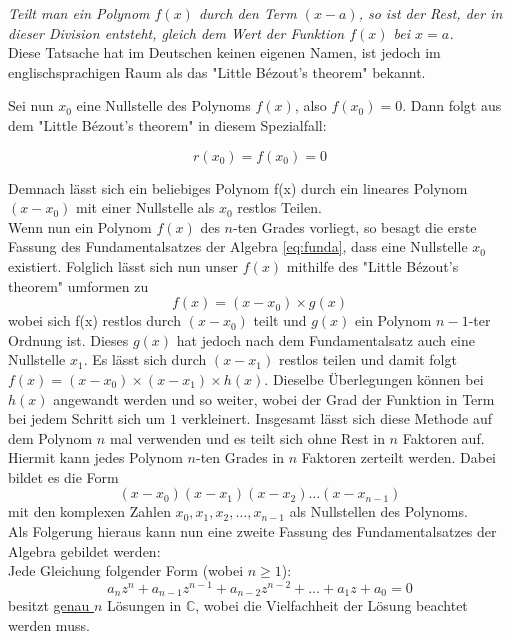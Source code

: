 \documentclass[a4paper,12pt]{article} %
\begin{document}
\noindent \emph{Teilt man ein Polynom $f(x)$ durch den Term $(x-a)$, so ist der Rest, der in dieser Division entsteht, gleich dem Wert der Funktion $f(x)$ bei $x=a$.}\\

Diese Tatsache hat im Deutschen keinen eigenen Namen, ist jedoch im englischsprachigen Raum als das "Little Bézout's theorem" bekannt.

Sei nun $x_0$ eine Nullstelle des Polynoms $f(x)$, also $f(x_0)=0$. Dann folgt aus dem "Little Bézout's theorem" {}in diesem Spezialfall:


\begin{equation}\label{eq:bezout0}
r(x_0) = f(x_0)=0
\end{equation}

Demnach lässt sich ein beliebiges Polynom f(x) durch ein lineares Polynom $(x-x_0)$ mit einer Nullstelle als $x_0$ restlos Teilen.\\

Wenn nun ein Polynom $f(x)$ des $n$-ten Grades vorliegt, so besagt die erste Fassung des Fundamentalsatzes der Algebra \eqref{eq:funda}, dass eine Nullstelle $x_0$ existiert. Folglich lässt sich nun unser $f(x)$ mithilfe des "Little Bézout's theorem" {}umformen zu
\[f(x)=(x-x_0) \times g(x)\]
wobei sich f(x) restlos durch $(x-x_0)$ teilt und $g(x)$ ein Polynom $n-1$-ter Ordnung ist.
Dieses $g(x)$ hat jedoch nach dem Fundamentalsatz auch eine Nullstelle $x_1$.
Es lässt sich durch $(x-x_1)$ restlos teilen und damit folgt $f(x) = (x-x_0) \times (x-x_1) \times h(x)$.
Dieselbe Überlegungen können bei $h(x)$ angewandt werden und so weiter, wobei der Grad der Funktion in Term bei jedem Schritt sich um $1$ verkleinert.
Insgesamt lässt sich diese Methode auf dem Polynom $n$ mal verwenden und es teilt sich ohne Rest in $n$ Faktoren auf.\\

Hiermit kann jedes Polynom $n$-ten Grades in $n$ Faktoren zerteilt werden.
Dabei bildet es die Form
\[(x-x_0)(x-x_1)(x-x_2)\dots(x-x_{n-1})\]
mit den komplexen Zahlen $x_0, x_1, x_2,\dots,x_{n-1}$ als Nullstellen des Polynoms.\\




Als Folgerung hieraus kann nun eine zweite Fassung des Fundamentalsatzes der Algebra gebildet werden:\\

\noindent Jede Gleichung folgender Form (wobei $n \geq 1$):
\begin{equation}\label{eq:funda2}
	\boxed{	a_nz^n + a_{n-1}z^{n-1} + a_{n-2}z^{n-2} + \dots + a_1z + a_0 = 0
	}
\end{equation}
besitzt \underline{genau $n$} Lösungen in $\mathbb{C}$, wobei die Vielfachheit der Lösung beachtet werden muss.\\
\end{document}
